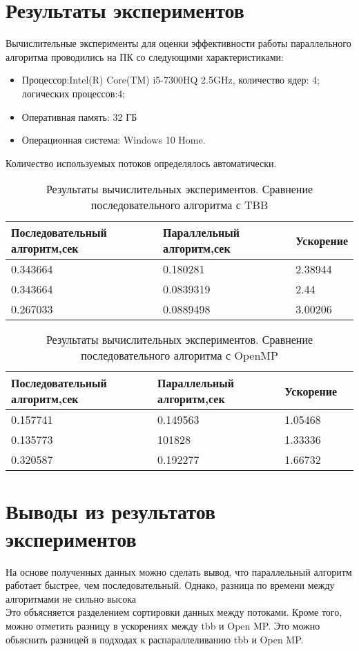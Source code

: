 \documentclass{report}
\begin{document}
\section*{Результаты экспериментов}
Вычислительные эксперименты для оценки эффективности работы параллельного алгоритма проводились на ПК со следующими характеристиками:
\begin{itemize}
\item Процессор:Intel(R) Core(TM) i5-7300HQ 2.5GHz, количество ядер: 4; логических процессов:4;
\item Оперативная память: 32 ГБ
\item Операционная система: Windows 10 Home.
\end{itemize}
\par Количество используемых потоков определялось автоматически.
\begin{table}[!h]
\caption{Результаты вычислительных экспериментов. Сравнение последовательного алгоритма с TBB}
\centering
\begin{tabular}{|p{4cm}|p{4cm}|p{3cm}|}
\hline
Последовательный алгоритм,сек & Параллельный алгоритм,сек & Ускорение  \\\hline
0.343664 & 0.180281 & 2.38944  \\\hline
0.343664 &  0.0839319 & 2.44  \\\hline
0.267033 &  0.0889498 & 3.00206  \\
\hline
\end{tabular}
\end{table}

\begin{table}[!h]
\caption{Результаты вычислительных экспериментов. Сравнение последовательного алгоритма с OpenMP}
\centering
\begin{tabular}{|p{4cm}|p{4cm}|p{4cm}|p{3cm}|}
\hline
Последовательный алгоритм,сек & Параллельный алгоритм,сек & Ускорение  \\\hline
0.157741 &  0.149563 & 1.05468  \\\hline
0.135773 & 101828 & 1.33336  \\\hline
0.320587 & 0.192277 & 1.66732  \\
\hline
\end{tabular}
\end{table}

\newpage

\section*{Выводы из результатов экспериментов}
\par На основе полученных данных можно сделать вывод, что параллельный алгоритм работает быстрее, чем последовательный. Однако, разница по времени между алгоритмами не сильно высока\\
Это объясняется разделением сортировки данных между потоками. Кроме того, можно отметить разницу в ускорениях между tbb и Open MP. Это можно обьяснить разницей в подходах к распараллеливанию tbb и Open MP.
\end{document}
